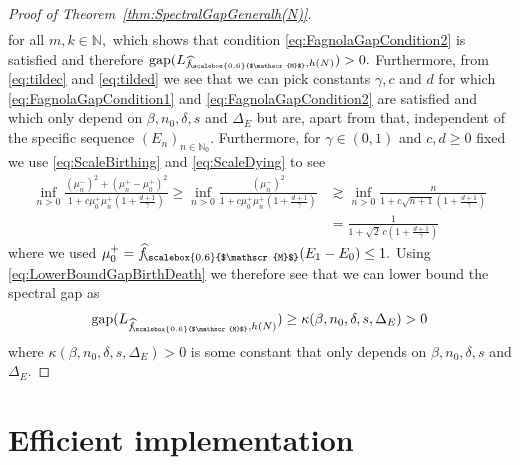 \documentclass[11pt]{amsart}
\newcommand{\1}{\mathbbm{1}}
\newcommand{\N}{\mathbb{N}}
\newcommand{\hatfM}{\widehat{f}_{\!\scalebox{0.6}{$\mathscr{M}$}}
}
\newcommand{\bin}[1]{}
\theoremstyle{plain}
\theoremstyle{definition}
\theoremstyle{remark}
\numberwithin{equation}{section}
\begin{document}
\begin{proof}[Proof of Theorem~\ref{thm:SpectralGapGeneralh(N)}]
\begin{align*}
\end{align*}
for all $m,k\in\mathbb{N},$ which shows that condition \eqref{eq:FagnolaGapCondition2} is satisfied and therefore $\operatorname{gap}(L_{\smash{\hatfM,h(N)}})>0.$
Furthermore, from \eqref{eq:tildec} and \eqref{eq:tilded} we see that we can pick constants $\gamma,c$ and $d$ for which \eqref{eq:FagnolaGapCondition1} and \eqref{eq:FagnolaGapCondition2} are satisfied
and 
which only depend on $\beta,n_0,\delta, s$
and $\Delta_E$ but are, apart from that, independent of the specific sequence $\left(E_n\right)_{n\in\N_0}.$ Furthermore, for $\gamma\in(0,1)$ and $c,d\ge 0$ fixed
we use  \eqref{eq:ScaleBirthing} and \eqref{eq:ScaleDying}  to see 
\begin{align*}
\inf_{n > 0} 
\frac{(\mu^-_n)^2 + (\mu^+_n - \mu^+_0)^2}
{1 + c \mu^+_0 \mu^+_n \left( 1 + \frac{d + 1}{\gamma} \right)} \ge \inf_{n > 0} 
\frac{(\mu^-_n)^2}
{1 + c \mu^+_0 \mu^+_n \left( 1 + \frac{d + 1}{\gamma} \right)} &
\gtrsim \inf_{n > 0} 
\frac{n}
{1 + c \sqrt{n+1} \left( 1 + \frac{d + 1}{\gamma} \right)} \\ 
&=  \frac{1}
{1 + \sqrt{2}\, c   \left( 1 + \frac{d + 1}{\gamma} \right)}
\end{align*}
where we used
 $\mu^+_0 = \hatfM(E_1 -E_0)\le 1. $
Using \eqref{eq:LowerBoundGapBirthDeath} we therefore see that we can lower bound the spectral gap as \begin{align}
    \operatorname{gap}(L_{\hatfM,h(N)}) \ge \kappa(\beta,n_0,\delta,s,\Delta_E) >0
\end{align}
where $\kappa(\beta,n_0,\delta,s,\Delta_E)>0$ is some constant that only depends on $\beta,n_0,\delta,s$ and $\Delta_E.$ 

\bin{Lastly, note that for $n_0=0,$ we have that for $\gamma\in(0,1)$ fixed the constants $\tilde c$ and $\tilde d$ in \eqref{eq:tildec} and \eqref{eq:tilded} are decreasing for increasing $\beta.$ Hence, from \eqref{eq:LowerBoundGapBirthDeath} we see that for all $\beta'>0$ the spectral gap satisfies $\operatorname{gap}(L)\ge C_{\beta'}$ for some $C_{\beta'}>0$ and all $\beta\in[\beta',\infty).$}
\end{proof}








\section{Efficient implementation}\label{sec:implementations}
\end{document}
